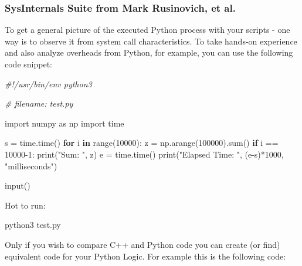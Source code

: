 \documentclass[
]{article}
\newenvironment{Shaded}{}{}
\newcommand{\BuiltInTok}[1]{#1}
\newcommand{\CommentTok}[1]{\textcolor[rgb]{0.38,0.63,0.69}{\textit{#1}}}
\newcommand{\ControlFlowTok}[1]{\textcolor[rgb]{0.00,0.44,0.13}{\textbf{#1}}}
\newcommand{\DecValTok}[1]{\textcolor[rgb]{0.25,0.63,0.44}{#1}}
\newcommand{\ExtensionTok}[1]{#1}
\newcommand{\ImportTok}[1]{#1}
\newcommand{\KeywordTok}[1]{\textcolor[rgb]{0.00,0.44,0.13}{\textbf{#1}}}
\newcommand{\NormalTok}[1]{#1}
\newcommand{\OperatorTok}[1]{\textcolor[rgb]{0.40,0.40,0.40}{#1}}
\newcommand{\StringTok}[1]{\textcolor[rgb]{0.25,0.44,0.63}{#1}}
\begin{document}
\hypertarget{sysinternals-suite-from-mark-rusinovich-et-al}{%
\subsubsection{SysInternals Suite from Mark Rusinovich, et
al.}\label{sysinternals-suite-from-mark-rusinovich-et-al}}

To get a general picture of the executed Python process with your
scripts - one way is to observe it from system call characteristics. To
take hands-on experience and also analyze overheads from Python, for
example, you can use the following code snippet:

\begin{Shaded}
\begin{Highlighting}[]
\CommentTok{\#!/usr/bin/env python3}

\CommentTok{\# filename: test.py}

\ImportTok{import}\NormalTok{ numpy }\ImportTok{as}\NormalTok{ np}
\ImportTok{import}\NormalTok{ time}

\NormalTok{s }\OperatorTok{=}\NormalTok{ time.time()}
\ControlFlowTok{for}\NormalTok{ i }\KeywordTok{in} \BuiltInTok{range}\NormalTok{(}\DecValTok{10000}\NormalTok{):}
\NormalTok{    z }\OperatorTok{=}\NormalTok{ np.arange(}\DecValTok{100000}\NormalTok{).}\BuiltInTok{sum}\NormalTok{()}
    \ControlFlowTok{if}\NormalTok{ i }\OperatorTok{==} \DecValTok{10000}\OperatorTok{{-}}\DecValTok{1}\NormalTok{:}
        \BuiltInTok{print}\NormalTok{(}\StringTok{"Sum: "}\NormalTok{, z)}
\NormalTok{e }\OperatorTok{=}\NormalTok{ time.time()}
\BuiltInTok{print}\NormalTok{(}\StringTok{"Elapsed Time: "}\NormalTok{, (e}\OperatorTok{{-}}\NormalTok{s)}\OperatorTok{*}\DecValTok{1000}\NormalTok{, }\StringTok{"milliseconds"}\NormalTok{)}

\BuiltInTok{input}\NormalTok{()}
\end{Highlighting}
\end{Shaded}

Hot to run:

\begin{Shaded}
\begin{Highlighting}[]
\ExtensionTok{python3}\NormalTok{ test.py}
\end{Highlighting}
\end{Shaded}

Only if you wish to compare C++ and Python code you can create (or find)
equivalent code for your Python Logic. For example this is the following
code:
\end{document}
